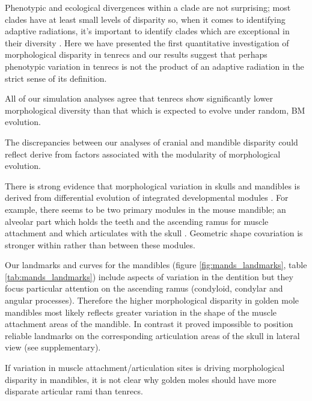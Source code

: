 \documentclass[12pt,a4paper]{article}
\begin{document}
Phenotypic and ecological divergences within a clade are not surprising; most clades have at least small levels of disparity so, when it comes to identifying adaptive radiations, it's important to identify clades which are exceptional in their diversity \citep{Losos2010a}. Here we have presented the first quantitative investigation of morphological disparity in tenrecs and our results suggest that perhaps phenotypic variation in tenrecs is not the product of an adaptive radiation in the strict sense of its definition.



All of our simulation analyses agree that tenrecs show significantly lower morphological diversity than that which is expected to evolve under random, BM evolution.



The discrepancies between our analyses of cranial and mandible disparity could reflect derive from factors associated with the modularity of morphological evolution.

There is strong evidence that morphological variation in skulls and mandibles is derived from differential evolution of integrated developmental modules \citep[reviewed by][]{Klingenberg2013a}.
For example, there seems to be two primary modules in the mouse mandible; an alveolar part which holds the teeth and the ascending ramus for muscle attachment and which articulates with the skull \citep{Klingenberg2008a}. Geometric shape covariation is stronger within rather than between these modules. 

Our landmarks and curves for the mandibles (figure \ref{fig:mands_landmarks}, table \ref{tab:mands_landmarks}) include aspects of variation in the dentition but they focus particular attention on the ascending ramus (condyloid, condylar and angular processes). Therefore the higher morphological disparity in golden mole mandibles most likely reflects greater variation in the shape of the muscle attachment areas of the mandible. In contrast it proved impossible to position reliable landmarks on the corresponding articulation areas of the skull in lateral view (see supplementary).

If variation in muscle attachment/articulation sites is driving morphological disparity in mandibles, it is not clear why golden moles should have more disparate articular rami than tenrecs. 
\end{document}
